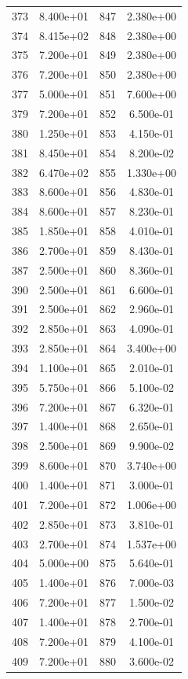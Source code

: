 \documentclass[12pt]{article}
\begin{document}
\begin{longtable}{@{}cccc@{}}
373 & 8.400e+01 & 847 & 2.380e+00 \\
374 & 8.415e+02 & 848 & 2.380e+00 \\
375 & 7.200e+01 & 849 & 2.380e+00 \\
376 & 7.200e+01 & 850 & 2.380e+00 \\
377 & 5.000e+01 & 851 & 7.600e+00 \\
379 & 7.200e+01 & 852 & 6.500e-01 \\
380 & 1.250e+01 & 853 & 4.150e-01 \\
381 & 8.450e+01 & 854 & 8.200e-02 \\
382 & 6.470e+02 & 855 & 1.330e+00 \\
383 & 8.600e+01 & 856 & 4.830e-01 \\
384 & 8.600e+01 & 857 & 8.230e-01 \\
385 & 1.850e+01 & 858 & 4.010e-01 \\
386 & 2.700e+01 & 859 & 8.430e-01 \\
387 & 2.500e+01 & 860 & 8.360e-01 \\
390 & 2.500e+01 & 861 & 6.600e-01 \\
391 & 2.500e+01 & 862 & 2.960e-01 \\
392 & 2.850e+01 & 863 & 4.090e-01 \\
393 & 2.850e+01 & 864 & 3.400e+00 \\
394 & 1.100e+01 & 865 & 2.010e-01 \\
395 & 5.750e+01 & 866 & 5.100e-02 \\
396 & 7.200e+01 & 867 & 6.320e-01 \\
397 & 1.400e+01 & 868 & 2.650e-01 \\
398 & 2.500e+01 & 869 & 9.900e-02 \\
399 & 8.600e+01 & 870 & 3.740e+00 \\
400 & 1.400e+01 & 871 & 3.000e-01 \\
401 & 7.200e+01 & 872 & 1.006e+00 \\
402 & 2.850e+01 & 873 & 3.810e-01 \\
403 & 2.700e+01 & 874 & 1.537e+00 \\
404 & 5.000e+00 & 875 & 5.640e-01 \\
405 & 1.400e+01 & 876 & 7.000e-03 \\
406 & 7.200e+01 & 877 & 1.500e-02 \\
407 & 1.400e+01 & 878 & 2.700e-01 \\
408 & 7.200e+01 & 879 & 4.100e-01 \\
409 & 7.200e+01 & 880 & 3.600e-02 \\

\end{longtable}
\end{document}
